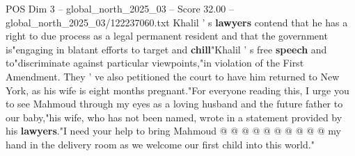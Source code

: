 \begin{textsample}{POS Dim 3 – global\_north\_2025\_03 – Score 32.00 – global\_north\_2025\_03/122237060.txt}
Khalil ' s \textbf{lawyers} contend that he has a right to due process as a legal permanent resident and that the government is"engaging in blatant efforts to target and \textbf{chill}"Khalil ' s free \textbf{speech} and to"discriminate against particular viewpoints,"in violation of the First Amendment.
They ' ve also petitioned the court to have him returned to New York, as his wife is eight months pregnant."For everyone reading this, I urge you to see Mahmoud through my eyes as a loving husband and the future father to our baby,"his wife, who has not been named, wrote in a statement provided by his \textbf{lawyers}."I need your help to bring Mahmoud @ @ @ @ @ @ @ @ @ @ my hand in the delivery room as we welcome our first child into this world."

\end{textsample}
